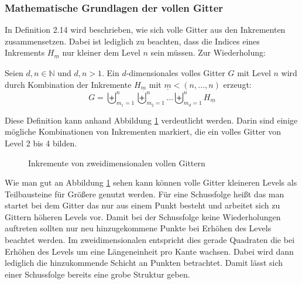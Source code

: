 \documentclass[a4paper,12pt]{llncs}
\numberwithin{equation}{section}
\begin{document}
\subsubsection{Mathematische Grundlagen der vollen Gitter}

In \cite{M13} Definition 2.14 wird beschrieben, wie sich volle Gitter aus den Inkrementen zusammensetzen. Dabei ist lediglich zu beachten, dass die Indices eines Inkrements $H_{\underline{m}}$ nur kleiner dem Level $n$ sein müssen.  Zur Wiederholung:

\begin{definition}
	Seien $d,n\in\mathbb{N}$ und $d,n>1$. Ein $d$-dimensionales volles Gitter $G$ mit Level $n$ wird durch Kombination der Inkremente $H_{\underline{m}}$ mit $\underline{m}<(n,\dots,n)$ erzeugt:
	\begin{equation}
		G=\biguplus_{m_1=1}^n\biguplus_{m_2=1}^n\dots \biguplus_{m_d=1}^n H_{\underline{m}}
	\end{equation}
\end{definition}

Diese Definition kann anhand Abbildung \ref{fig:gitter02} verdeutlicht werden. Darin sind einige mögliche Kombinationen von Inkrementen markiert, die ein volles Gitter von Level 2 bis 4 bilden.

\begin{figure}
	\caption{Inkremente von zweidimensionalen vollen Gittern}
	\label{fig:gitter02}
\end{figure}

Wie man gut an Abbildung \ref{fig:gitter02} sehen kann können volle Gitter kleineren Levels als Teilbausteine für Größere genutzt werden. Für eine Schussfolge heißt das man startet bei dem Gitter das nur aus einem Punkt besteht und arbeitet sich zu Gittern höheren Levels vor. Damit bei der Schussfolge keine Wiederholungen auftreten sollten nur neu hinzugekommene Punkte bei Erhöhen des Levels beachtet werden. Im zweidimensionalen entspricht dies gerade Quadraten die bei Erhöhen des Levels um eine Längeneinheit pro Kante wachsen. Dabei wird dann lediglich die hinzukommende Schicht an Punkten betrachtet. Damit lässt sich einer Schussfolge bereits eine grobe Struktur geben. 
\end{document}
